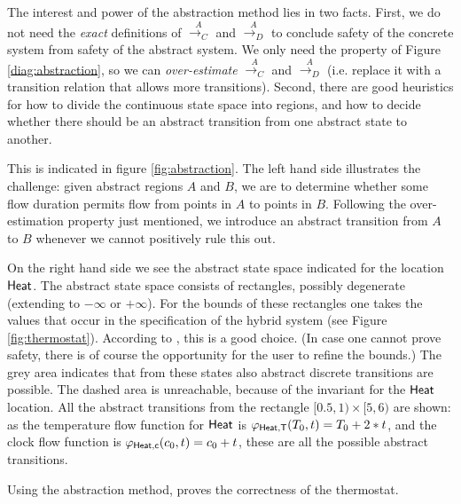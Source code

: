 \documentclass[runningheads]{llncs}
\def\phi{\varphi}
\newcommand{\ST}{{\sf T}}
\newcommand{\Sc}{{\sf c}}
\newcommand{\Heat}{{\sf Heat}}
\newcommand{\acontrans}{\stackrel{A}{\rightarrow_C}}
\newcommand{\adistrans}{\stackrel{A}{\rightarrow_D}}
\begin{document}
The interest and power of the abstraction method lies in two
facts. First, we do not need the {\em exact\/} definitions of
$\acontrans$ and $\adistrans$ to conclude safety of the concrete
system from safety of the abstract system. We only need the property
of Figure \ref{diag:abstraction}, so we can {\em over-estimate\/}
$\acontrans$ and $\adistrans$ (i.e. replace it with a transition
relation that allows more transitions). Second, there are good
heuristics for how to divide the continuous
state space into regions, and how to decide whether there should be an
abstract transition from one abstract state to another.

This is indicated in figure \ref{fig:abstraction}. The left hand side
illustrates the challenge: given abstract regions $A$ and $B$, we are
to determine whether some flow duration permits flow from points in
$A$ to points in $B$.  Following the over-estimation property just
mentioned, we introduce an abstract transition from $A$ to $B$
whenever we cannot positively rule this out.

On the right hand side we see the abstract state space indicated for the
location $\Heat$. The abstract state space consists of rectangles,
possibly degenerate (extending to $-\infty$ or $+\infty$). For the
bounds of these rectangles one takes the values that occur in the
specification of the hybrid system (see Figure
\ref{fig:thermostat}). According to \cite{alur}, this is a good
choice. (In case one cannot prove safety, there is of course
the opportunity for the user to refine the bounds.)  The grey area indicates
that from these states also abstract discrete transitions are
possible. The dashed area is unreachable, because of the invariant for
the $\Heat$ location. %
All the abstract
transitions from the rectangle $[0.5,1) \times[5,6)$ are shown: as the
    temperature flow function for $\Heat$ is $\phi_{\Heat,\ST}(T_0,t)= T_0 +
    2 * t$, and the clock flow function is $\phi_{\Heat,\Sc}(c_0,t) = c_0 +
    t$, these are all the possible abstract transitions.

Using the abstraction method, \cite{alur} proves the correctness of the thermostat.
\end{document}

